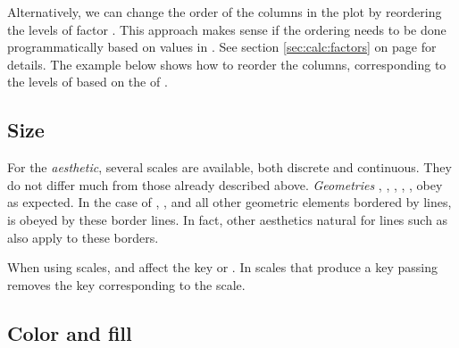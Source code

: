 \documentclass[krantz2]{krantz}\usepackage{knitr}
\begin{document}
Alternatively, we can change the order of the columns in the plot by reordering the levels of factor . This approach makes sense if the ordering needs to be done programmatically based on values in . See section \ref{sec:calc:factors} on page \pageref{sec:calc:factors} for details. The example below shows how to reorder the columns, corresponding to the levels of  based on the  of .

\begin{knitrout}\footnotesize
{}\color{fgcolor}\begin{kframe}
\begin{alltt}
 \hlstd{(}\hlstd{(} \hlstd{=}      \hlopt{+}
  \hlstd{(} \hlstd{=} \hlstd{,}  
\end{alltt}
\end{kframe}
\end{knitrout}


\subsection{Size}
For the  \emph{aesthetic}, several scales are available, both discrete and continuous. They do not differ much from those already described above. \emph{Geometries} , , , , ,  obey  as expected. In the case of , ,  and all other geometric elements bordered by lines,  is obeyed by these border lines. In fact, other aesthetics natural for lines such as  also apply to these borders.

When using  scales,  and  affect the key or . In scales that produce a key passing  removes the key corresponding to the scale.

\subsection{Color and fill}
\end{document}
